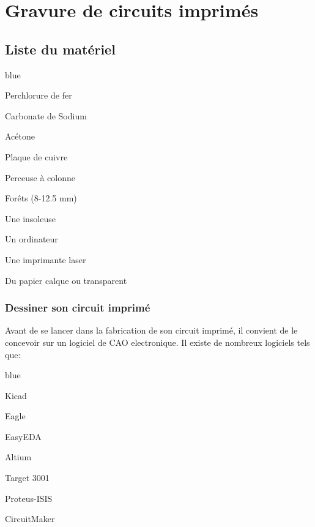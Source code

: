 

\chapter{Gravure de circuits imprimés}

\section{Liste du matériel}

\begin{items}{blue}{\Bullet}
	\item Perchlorure de fer
	\item Carbonate de Sodium
	\item Acétone
	\item Plaque de cuivre 
	\item Perceuse à colonne
	\item Forêts (8-12.5 mm)
	\item Une insoleuse
	\item Un ordinateur
	\item Une imprimante laser
	\item Du papier calque ou transparent
\end{items}

\subsection{Dessiner son circuit imprimé}

Avant de se lancer dans la fabrication de son circuit imprimé, il convient de le concevoir sur un logiciel de CAO electronique.
Il existe de nombreux logiciels tels que:

\begin{items}{blue}{\Bullet}
	\item Kicad
	\item Eagle
	\item EasyEDA
	\item Altium 
	\item Target 3001
	\item Proteus-ISIS
	\item CircuitMaker
\end{items}

